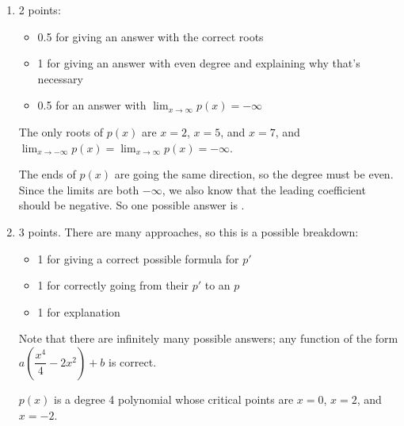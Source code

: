 \documentclass{article}
\begin{document}
\begin{enumerate}
  \begin{enumerate}
  \item

    \begin{grading}
      2 points:
      \begin{itemize}[nosep]
      \item 0.5 for giving an answer with the correct roots
      \item 1 for giving an answer with even degree and explaining why that's necessary
      \item 0.5 for an answer with $\displaystyle \lim_{x \to \infty} p(x) = -\infty$
      \end{itemize}
    \end{grading}

    \begin{problem}[\vfill]
      The only roots of $p(x)$ are $x = 2$, $x = 5$, and $x = 7$, and $\displaystyle \lim_{x \to -\infty} p(x) = \lim_{x \to \infty} p(x) = -\infty$. 
    \end{problem}

    \begin{solution}
      The ends of $p(x)$ are going the same direction, so the degree
      must be even. Since the limits are both $-\infty$, we also know that the leading coefficient
      should be negative. So one possible answer is 
      .
    \end{solution}

  \item

    \begin{grading}
      3 points. There are many approaches, so this is a possible breakdown:
      \begin{itemize}[nosep]
      \item 1 for giving a correct possible formula for $p'$
      \item 1 for correctly going from their $p'$ to an $p$
      \item 1 for explanation
      \end{itemize}
      Note that there are infinitely many possible answers; any function of the form $a \left( \dfrac{x^4}{4} -2 x^2 \right) + b$ is correct. 
    \end{grading}

    \begin{problem}[\nstretch{1.25}]
      $p(x)$ is a degree 4 polynomial whose critical points are $x = 0$, $x = 2$, and $x = -2$. 
    \end{problem}


\end{enumerate}
\end{enumerate}
\end{document}

